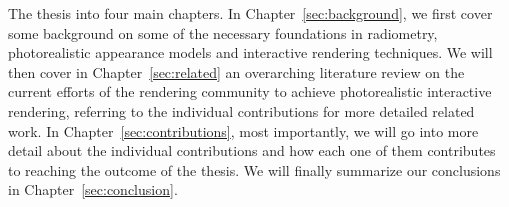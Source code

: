 The thesis into four main chapters. In Chapter~\ref{sec:background}, we first cover some background on some of the necessary foundations in radiometry, photorealistic appearance models and interactive rendering techniques. We will then cover in Chapter~\ref{sec:related} an overarching literature review on the current efforts of the rendering community to achieve photorealistic interactive rendering, referring to the individual contributions for more detailed related work. In Chapter~\ref{sec:contributions}, most importantly, we will go into more detail about the individual contributions and how each one of them contributes to reaching the outcome of the thesis. We will finally summarize our conclusions in Chapter~\ref{sec:conclusion}. 
